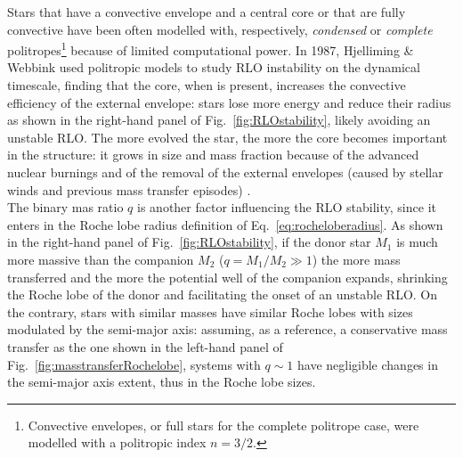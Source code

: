 \documentclass[a4paper,titlepage]{book}     	%
\begin{document}
Stars that have a convective envelope and a central core or that are fully convective have been often modelled with, respectively, \emph{condensed} or \emph{complete} politropes\footnote{Convective envelopes, or full stars for the complete politrope case, were modelled with a politropic index $n=3/2$.} because of limited computational power. In 1987, Hjelliming \& Webbink used politropic models to study RLO instability on the dynamical timescale, finding that the core, when is present, increases the convective efficiency of the external envelope: stars lose more energy and reduce their radius as shown in the right-hand panel of Fig.\ \ref{fig:RLOstability}, likely avoiding an unstable RLO. The more evolved the star, the more the core becomes important in the structure: it grows in size and mass fraction because of the advanced nuclear burnings and of the removal of the external envelopes (caused by stellar winds and previous mass transfer episodes) \cite{hjellmingwebbink1987_coreRLOF} .\\

The binary mas ratio $q$ is another factor influencing the RLO stability, since it enters in the Roche lobe radius definition of Eq.\ \ref{eq:rocheloberadius}. As shown in the right-hand panel of Fig.\ \ref{fig:RLOstability}, if the donor star $M_1$ is much more massive than the companion $M_2$ ($q=M_1/M_2 \gg 1$) the more mass transferred and the more the potential well of the companion expands, shrinking the Roche lobe of the donor and facilitating the onset of an unstable RLO. On the contrary, stars with similar masses have similar Roche lobes with sizes modulated by the semi-major axis: assuming, as a reference, a conservative mass transfer as the one shown in the left-hand panel of Fig.\ \ref{fig:masstransferRochelobe}, systems with $q \sim 1$ have negligible changes in the semi-major axis extent, thus in the Roche lobe sizes. \\
\end{document}
